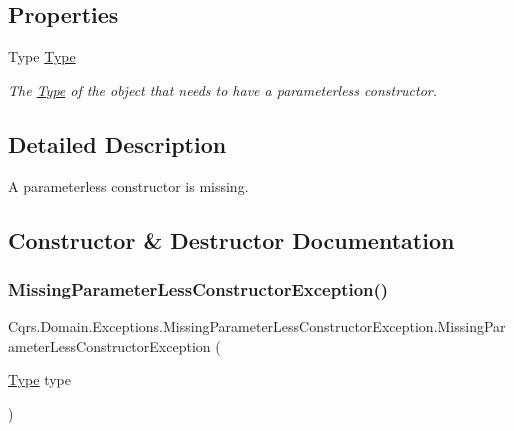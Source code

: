 \subsection*{Properties}
\begin{DoxyCompactItemize}
\item 
Type \hyperlink{classCqrs_1_1Domain_1_1Exceptions_1_1MissingParameterLessConstructorException_a9350872fe9744fbd82af49b2e663ccc0_a9350872fe9744fbd82af49b2e663ccc0}{Type}
\begin{DoxyCompactList}\small\item\em The \hyperlink{classCqrs_1_1Domain_1_1Exceptions_1_1MissingParameterLessConstructorException_a9350872fe9744fbd82af49b2e663ccc0_a9350872fe9744fbd82af49b2e663ccc0}{Type} of the object that needs to have a parameterless constructor. \end{DoxyCompactList}\end{DoxyCompactItemize}


\subsection{Detailed Description}
A parameterless constructor is missing. 



\subsection{Constructor \& Destructor Documentation}
\mbox{\label{classCqrs_1_1Domain_1_1Exceptions_1_1MissingParameterLessConstructorException_a5de10c873bab008d2527ff96fdf5f6b2_a5de10c873bab008d2527ff96fdf5f6b2}} 
\subsubsection{\texorpdfstring{Missing\+Parameter\+Less\+Constructor\+Exception()}{MissingParameterLessConstructorException()}}
{\footnotesize\ttfamily Cqrs.\+Domain.\+Exceptions.\+Missing\+Parameter\+Less\+Constructor\+Exception.\+Missing\+Parameter\+Less\+Constructor\+Exception (\begin{DoxyParamCaption}\item[{\hyperlink{classCqrs_1_1Domain_1_1Exceptions_1_1MissingParameterLessConstructorException_a9350872fe9744fbd82af49b2e663ccc0_a9350872fe9744fbd82af49b2e663ccc0}{Type}}]{type }\end{DoxyParamCaption})}



